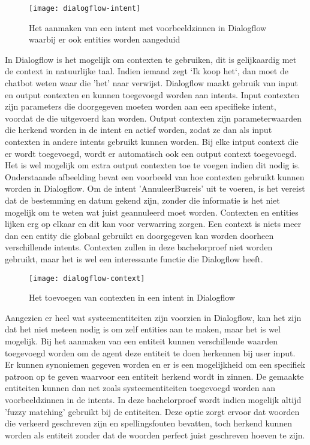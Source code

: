 \begin{figure}[H]
    \label{fig:dialogflow-intent}
    \centering
    \texttt{[image: dialogflow-intent]}
    \caption{Het aanmaken van een intent met voorbeeldzinnen in Dialogflow waarbij er ook entities worden aangeduid}
\end{figure}

In Dialogflow is het mogelijk om contexten te gebruiken, dit is gelijkaardig met de context in natuurlijke taal. Indien iemand zegt `Ik koop het`, dan moet de chatbot weten waar die 'het' naar verwijst. Dialogflow maakt gebruik van input en output contexten en kunnen toegevoegd worden aan intents. Input contexten zijn parameters die doorgegeven moeten worden aan een specifieke intent, voordat de die uitgevoerd kan worden. Output contexten zijn parameterwaarden die herkend worden in de intent en actief worden, zodat ze dan als input contexten in andere intents gebruikt kunnen worden. Bij elke intput context die er wordt toegevoegd, wordt er automatisch ook een output context toegevoegd. Het is wel mogelijk om extra output contexten toe te voegen indien dit nodig is. Onderstaande afbeelding bevat een voorbeeld van hoe contexten gebruikt kunnen worden in Dialogflow. Om de intent 'AnnuleerBusreis' uit te voeren, is het vereist dat de bestemming en datum gekend zijn, zonder die informatie is het niet mogelijk om te weten wat juist geannuleerd moet worden. Contexten en entities lijken erg op elkaar en dit kan voor verwarring zorgen. Een context is niets meer dan een entity die globaal gebruikt en doorgegeven kan worden doorheen verschillende intents. Contexten zullen in deze bachelorproef niet worden gebruikt, maar het is wel een interessante functie die Dialogflow heeft.

\begin{figure}[H]
    \label{fig:dialogflow-context}
    \centering
    \texttt{[image: dialogflow-context]}
    \caption{Het toevoegen van contexten in een intent in Dialogflow}
\end{figure}

Aangezien er heel wat systeementiteiten zijn voorzien in Dialogflow, kan het zijn dat het niet meteen nodig is om zelf entities aan te maken, maar het is wel mogelijk. Bij het aanmaken van een entiteit kunnen verschillende waarden toegevoegd worden om de agent deze entiteit te doen herkennen bij user input. Er kunnen synoniemen gegeven worden en er is een mogelijkheid om een specifiek patroon op te geven waarvoor een entiteit herkend wordt in zinnen. De gemaakte entiteiten kunnen dan net zoals systeementiteiten toegevoegd worden aan voorbeeldzinnen in de intents. In deze bachelorproef wordt indien mogelijk altijd 'fuzzy matching' gebruikt bij de entiteiten. Deze optie zorgt ervoor dat woorden die verkeerd geschreven zijn en spellingsfouten bevatten, toch herkend kunnen worden als entiteit zonder dat de woorden perfect juist geschreven hoeven te zijn.

